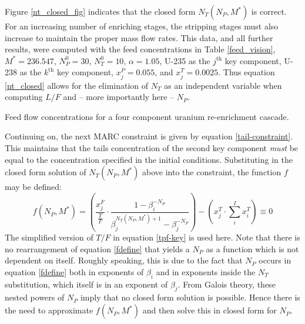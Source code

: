\documentclass{ansconf}
\newcommand{\nuc}[2]{{#1}-{#2}}
\newcommand{\jth}[0]{$j^{\mbox{th}}$ }
\newcommand{\kth}[0]{$k^{\mbox{th}}$ }
\begin{document}
Figure \ref{nt_closed_fig} indicates that the closed form $N_T(N_P, M^*)$ is correct.
For an increasing number of enriching stages, the stripping stages must also 
increase to maintain the proper mass flow rates.
This data, and all further results, were computed 
with the feed concentrations in Table \ref{feed_vision}, 
$M^*=236.547$, $N_P^0=30$, $N_T^0=10$, $\alpha=1.05$, 
\nuc{U}{235} as the \jth key component, \nuc{U}{238} as the \kth key component, 
$x_j^P=0.055$, and $x_j^T=0.0025$.
Thus equation \ref{nt_closed} allows for the elimination of $N_T$ as an 
independent variable when computing $L/F$ and -- more importantly here -- $N_P$.  

\begin{table}[htbp]
\begin{center}
\caption{Feed flow concentrations for a four component uranium re-enrichment cascade.}

\label{feed_vision}
\end{center}
\end{table}

Continuing on, the next MARC constraint is given by equation \ref{tail-constraint}.  
This maintains that the tails concentration of the second key component \emph{must} 
be equal to the concentration specified in the initial conditions.  
Substituting in the closed form solution of $N_T(N_P, M^*)$ above into the constraint, 
the function $f$ may be defined:
\begin{equation}
f(N_P,M^*) =
\left(\frac{x_j^F}{\frac{T}{F}} \cdot \frac{1 - \beta_i^{-N_P}}
                                           {\beta_j^{N_T(N_P,M^*)+1} - \beta_j^{-N_P}} \right)
- \left(x_j^T\cdot\sum_i^{I} x_i^T\right) \equiv 0
\label{fdefine}
\end{equation}
The simplified version of $T/F$ in equation \ref{tpf-key} is used here.  Note
that there is no rearrangement of equation \ref{fdefine} that yields a $N_P$ as 
a function which is not dependent on itself.  Roughly speaking, this is due to the 
fact that $N_P$ occurs in equation \ref{fdefine} both in exponents of $\beta_i$ and
in exponents inside the $N_T$ substitution, which itself is in an exponent of 
$\beta_j$.  From Galois theory, these nested powers of $N_P$ imply that no closed form 
solution is possible.   Hence there is the need to approximate $f(N_P, M^*)$ and then
solve this in closed form for $N_P$.
\end{document}
